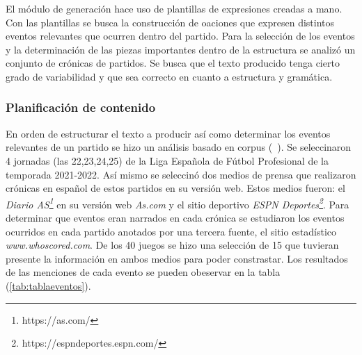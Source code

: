     El módulo de generación hace uso de plantillas de expresiones creadas a mano. Con las plantillas se busca la 
construcción de oaciones que expresen distintos eventos relevantes que ocurren dentro del partido. Para la selección de 
los eventos y la determinación de las piezas importantes dentro de la estructura se analizó un conjunto de crónicas de partidos. 
Se busca que el texto producido tenga cierto grado de variabilidad y que sea correcto en cuanto a estructura y gramática.


\subsubsection{Planificación de contenido}

    En orden de estructurar el texto a producir así como determinar los eventos relevantes de un partido se hizo un análisis basado en 
corpus (~\cite{reiter_dale_2000}). Se seleccinaron 4 jornadas (las 22,23,24,25) de la Liga Española de Fútbol Profesional de la temporada 
2021-2022. Así mismo se seleccinó dos medios de prensa que realizaron crónicas en español de estos partidos en su versión web. Estos medios 
fueron: el \textit{Diario AS\footnote[1]{https://as.com/}} en su versión web \textit{As.com} y el sitio deportivo 
\textit{ESPN Deportes\footnote[2]{https://espndeportes.espn.com/}}. Para determinar que eventos eran narrados en cada crónica se 
estudiaron los eventos ocurridos en cada partido anotados por una tercera fuente, el sitio estadístico \textit{www.whoscored.com}. 
De los 40 juegos se hizo una selección de 15 que tuvieran presente la información en ambos medios para poder constrastar. Los resultados de las 
menciones de cada evento se pueden obeservar en la tabla (\ref{tab:tablaeventos}).\\

